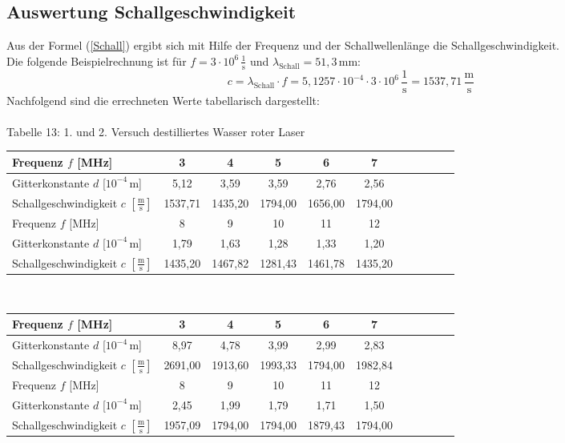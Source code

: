 \documentclass[fontsize=12pt]{scrartcl}
\begin{document}
\subsection{Auswertung Schallgeschwindigkeit}

Aus  der Formel (\ref{Schall}) ergibt sich mit Hilfe der Frequenz und der Schallwellenlänge die Schallgeschwindigkeit.\\
Die folgende Beispielrechnung ist für $f=3  \cdot 10^6\,\frac{1}{{\text{s}}}$ und $\lambda_{\text{Schall}}= 51,3$\,mm:
\begin{equation*}
c=\lambda_{\text{Schall}} \cdot f= 5,1257\cdot 10^{-4} \cdot 3 \cdot 10^6\,\frac{1}{{\text{s}}} = 1537,71\,\frac{{\text{m}}}{{\text{s}}}
\end{equation*}
\noindent
Nachfolgend sind die errechneten Werte tabellarisch dargestellt: \\
~\\
Tabelle 13: 1. und 2. Versuch destilliertes Wasser roter Laser  \\
\begin{tabular}{|l|c|c|c|c|c|c|c|c|c|c|} \hline
Frequenz $f$ [MHz] & 3 & 4 & 5 & 6 & 7 \\ \hline
Gitterkonstante $d$ [$10^{-4}$\,m] & 5,12 & 3,59 & 3,59 & 2,76 & 2,56  \\ \hline
Schallgeschwindigkeit $c$ $[\frac{{\text{m}}}{{\text{s}}}]$ & 1537,71 &1435,20 &1794,00 &1656,00 & 1794,00 \\ \hline
Frequenz $f$ [MHz] & 8 & 9 & 10 & 11 & 12\\ \hline
Gitterkonstante $d$ [$10^{-4}$\,m] &  1,79 & 1,63 & 1,28 & 1,33 & 1,20 \\ \hline
Schallgeschwindigkeit $c$ $[\frac{{\text{m}}}{{\text{s}}}]$ & 1435,20 & 1467,82 &1281,43 &1461,78 &1435,20 \\ \hline
\end{tabular} \\
\begin{tabular}{|l|c|c|c|c|c|c|c|c|c|c|} \hline
Frequenz $f$ [MHz] & 3 & 4 & 5 & 6 & 7 \\ \hline
Gitterkonstante $d$ [$10^{-4}$\,m] & 8,97 & 4,78 & 3,99 & 2,99 & 2,83 \\ \hline 
Schallgeschwindigkeit $c$ $[\frac{{\text{m}}}{{\text{s}}}]$ &  2691,00 & 1913,60 & 1993,33 & 1794,00 & 1982,84  \\ \hline
Frequenz $f$ [MHz] &  8 & 9 & 10 & 11 & 12 \\ \hline
Gitterkonstante $d$ [$10^{-4}$\,m] & 2,45 & 1,99 & 1,79 & 1,71 & 1,50 \\ \hline 
Schallgeschwindigkeit $c$ $[\frac{{\text{m}}}{{\text{s}}}]$ & 1957,09 & 1794,00 & 1794,00 & 1879,43 & 1794,00   \\ \hline
\end{tabular} \\
\end{document}
